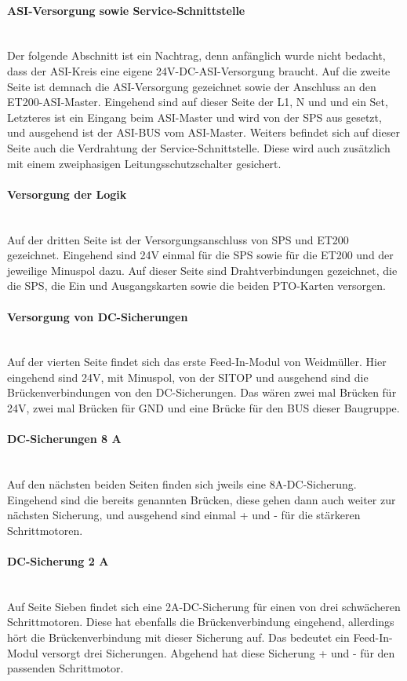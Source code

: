     \paragraph{ASI-Versorgung sowie Service-Schnittstelle}\mbox{}\\
    Der folgende Abschnitt ist ein Nachtrag, denn anfänglich wurde nicht bedacht, dass der ASI-Kreis eine eigene 24V-DC-ASI-Versorgung braucht. Auf die zweite Seite ist demnach die ASI-Versorgung gezeichnet sowie der Anschluss an den ET200-ASI-Master. Eingehend sind auf dieser Seite der L1, N und und ein Set, Letzteres ist ein Eingang beim ASI-Master und wird von der SPS aus gesetzt, und ausgehend ist der ASI-BUS vom ASI-Master. Weiters befindet sich auf dieser Seite auch die Verdrahtung der Service-Schnittstelle. Diese wird auch zusätzlich mit einem zweiphasigen Leitungsschutzschalter gesichert.
    \paragraph{Versorgung der Logik}\mbox{}\\
    Auf der dritten Seite ist der Versorgungsanschluss von SPS und ET200 gezeichnet. Eingehend sind 24V einmal für die SPS sowie für die ET200 und der jeweilige Minuspol dazu. Auf dieser Seite sind Drahtverbindungen gezeichnet, die die SPS, die Ein und Ausgangskarten sowie die beiden PTO-Karten versorgen.
    \paragraph{Versorgung von DC-Sicherungen}\mbox{}\\
    Auf der vierten Seite findet sich das erste Feed-In-Modul von Weidmüller. Hier eingehend sind 24V, mit Minuspol, von der SITOP und ausgehend sind die Brückenverbindungen von den DC-Sicherungen. Das wären zwei mal Brücken für 24V, zwei mal Brücken für GND und eine Brücke für den BUS dieser Baugruppe.
    \paragraph{DC-Sicherungen 8 A}\mbox{}\\
    Auf den nächsten beiden Seiten finden sich jweils eine 8A-DC-Sicherung. Eingehend sind die bereits genannten Brücken, diese gehen dann auch weiter zur nächsten Sicherung, und ausgehend sind einmal + und - für die stärkeren Schrittmotoren.
    \paragraph{DC-Sicherung 2 A}\mbox{}\\
    Auf Seite Sieben findet sich eine 2A-DC-Sicherung für einen von drei schwächeren Schrittmotoren. Diese hat ebenfalls die Brückenverbindung eingehend, allerdings hört die Brückenverbindung mit dieser Sicherung auf. Das bedeutet ein Feed-In-Modul versorgt drei Sicherungen. Abgehend hat diese Sicherung + und - für den passenden Schrittmotor.
